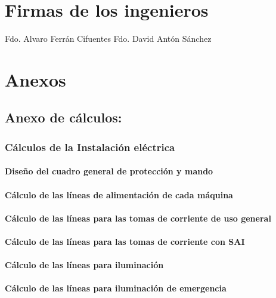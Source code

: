\newpage\section {Firmas de los ingenieros}
\vspace{5cm}
Fdo. Alvaro Ferrán Cifuentes
\vspace{5cm}\hspace{5cm}
Fdo. David Antón Sánchez

\newpage \section{Anexos}

   
\subsection{Anexo de cálculos:}

\subsubsection{Cálculos de la Instalación eléctrica}
\paragraph{Diseño del cuadro general de protección y mando}
\paragraph{Cálculo de las líneas de alimentación de cada máquina}
\paragraph{Cálculo de las líneas para las tomas de corriente de uso general}
\paragraph{Cálculo de las líneas para las tomas de corriente con SAI}
\paragraph{Cálculo de las líneas para iluminación}
\paragraph{Cálculo de las líneas para iluminación de emergencia}


